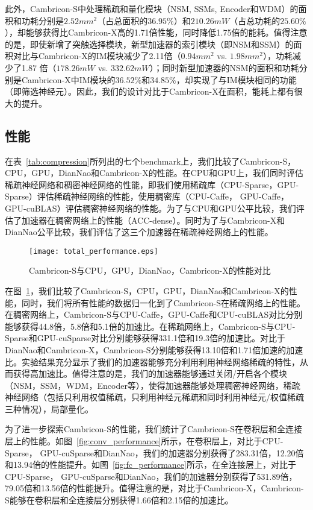此外，Cambricon-S中处理稀疏和量化模块（NSM, SSMs, Encoder和WDM）的面积和功耗分别是$2.52mm^2$（占总面积的$36.95\%$）和$210.26mW$（占总功耗的$25.60\%$），却能够获得比Cambricon-X高的1.71倍性能，同时降低1.75倍的能耗。值得注意的是，即使新增了突触选择模块，新型加速器的索引模块（即NSM和SSM）的面积对比与Cambricon-X的IM模块减少了2.11倍（$0.94mm^2$ vs. $1.98mm^2$），功耗减少了1.87 倍（$178.26mW$ vs. $332.62mW$）；同时新型加速器的NSM的面积和功耗分别是Cambricon-X中IM模块的$36.52\%$和$34.85\%$，却实现了与IM模块相同的功能（即筛选神经元）。因此，我们的设计对比于Cambricon-X在面积，能耗上都有很大的提升。

\subsection{性能}
在表~\ref{tab:compression}所列出的七个benchmark上，我们比较了Cambricon-S，CPU，GPU，DianNao和Cambricon-X的性能。在CPU和GPU上，我们同时评估稀疏神经网络和稠密神经网络的性能，即我们使用稀疏库（CPU-Sparse，GPU-Sparse）评估稀疏神经网络的性能，使用稠密库（CPU-Caffe， GPU-Caffe， GPU-cuBLAS）评估稠密神经网络的性能。为了与CPU和GPU公平比较，我们评估了加速器在稠密网络上的性能（ACC-dense）。同时为了与Cambricon-X和DianNao公平比较，我们评估了这三个加速器在稀疏神经网络上的性能。

\begin{figure}[h]
\centering
\texttt{[image: total\_performance.eps]}
\caption{Cambricon-S与CPU，GPU，DianNao，Cambricon-X的性能对比}
\label{fig:total_performance}
\end{figure}

在图~\ref{fig:total_performance}，我们比较了Cambricon-S，CPU，GPU，DianNao和Cambricon-X的性能，同时，我们将所有性能的数据归一化到了Cambricon-S在稀疏网络上的性能。在稠密网络上，Cambricon-S与CPU-Caffe，GPU-Caffe和CPU-cuBLAS对比分别能够获得44.8倍，5.8倍和5.1倍的加速比。在稀疏网络上，Cambricon-S与CPU-Sparse和GPU-cuSparse对比分别能够获得331.1倍和19.3倍的加速比。对比于DianNao和Cambricon-X，Cambricon-S分别能够获得13.10倍和1.71倍加速的加速比。实验结果充分显示了我们的加速器能够充分利用利用神经网络稀疏的特性，从而获得高加速比。值得注意的是，我们的加速器能够通过关闭/开启各个模块（NSM，SSM，WDM，Encoder等），使得加速器能够处理稠密神经网络，稀疏神经网络（包括只利用权值稀疏，只利用神经元稀疏和同时利用神经元/权值稀疏三种情况），局部量化。

为了进一步探索Cambricon-S的性能，我们统计了Cambricon-S在卷积层和全连接层上的性能。如图~\ref{fig:conv_performance}所示，在卷积层上，对比于CPU-Sparse， GPU-cuSparse和DianNao，我们的加速器分别获得了283.31倍，12.20倍和13.94倍的性能提升。如图~\ref{fig:fc_performance}所示，在全连接层上，对比于CPU-Sparse， GPU-cuSparse和DianNao，我们的加速器分别获得了531.89倍，79.05倍和13.56倍的性能提升。值得注意的是，对比于Cambricon-X，Cambricon-S能够在卷积层和全连接层分别获得1.66倍和2.15倍的加速比。

